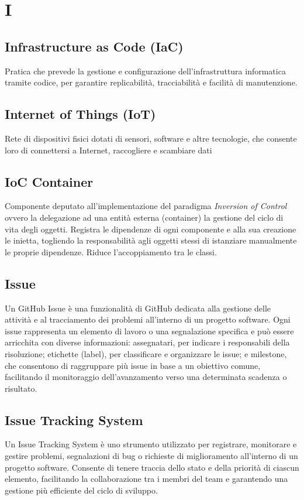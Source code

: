 \documentclass[10pt, letterpaper]{article}
\begin{document}
\section{I}

\subsection*{Infrastructure as Code (IaC)}
Pratica che prevede la gestione e configurazione dell'infrastruttura informatica tramite codice, per garantire replicabilità, tracciabilità e facilità di manutenzione.

\subsection*{Internet of Things (IoT)}
Rete di dispositivi fisici dotati di sensori, software e altre tecnologie, che consente loro di connettersi a Internet, raccogliere e scambiare dati

\subsection*{IoC Container}
Componente deputato all'implementazione del paradigma \textit{Inversion of Control} ovvero la delegazione ad una entità esterna (container) la gestione del ciclo di vita degli oggetti.
Registra le dipendenze di ogni componente e alla sua creazione le inietta, togliendo la responsabilità agli oggetti stessi di istanziare manualmente le proprie dipendenze.
Riduce l'accoppiamento tra le classi.

\subsection*{Issue}
Un GitHub Issue è una funzionalità di GitHub dedicata alla gestione delle attività e al tracciamento dei problemi all'interno di un progetto software.
Ogni issue rappresenta un elemento di lavoro o una segnalazione specifica e può essere arricchita con diverse informazioni: assegnatari, per indicare i
responsabili della risoluzione; etichette (label), per classificare e organizzare le issue; e milestone, che consentono di raggruppare più issue in base a un
obiettivo comune, facilitando il monitoraggio dell'avanzamento verso una determinata scadenza o risultato.

\subsection*{Issue Tracking System}
Un Issue Tracking System è uno strumento utilizzato per registrare, monitorare e gestire problemi, segnalazioni di bug o richieste di miglioramento all'interno
di un progetto software. Consente di tenere traccia dello stato e della priorità di ciascun elemento, facilitando la collaborazione tra i membri del team e
garantendo una gestione più efficiente del ciclo di sviluppo.
\end{document}
